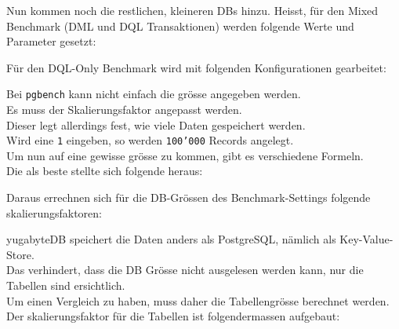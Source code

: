 \begin{flushleft}
    Nun kommen noch die restlichen, kleineren DBs hinzu.
    Heisst, für den Mixed Benchmark (DML und DQL \Gls{Transaktion}en) werden folgende Werte und Parameter gesetzt:
    
\end{flushleft}
\begin{flushleft}
    Für den DQL-Only Benchmark wird mit folgenden Konfigurationen gearbeitet:
    
\end{flushleft}
\begin{flushleft}
    Bei \texttt{pgbench} kann nicht einfach die grösse angegeben werden.\\
    Es muss der Skalierungsfaktor angepasst werden.\\
    Dieser legt allerdings fest, wie viele Daten gespeichert werden.\\
    Wird eine \texttt{1} eingeben, so werden \texttt{100'000} Records angelegt.\\

    Um nun auf eine gewisse grösse zu kommen, gibt es verschiedene Formeln.\\
    Die als beste stellte sich folgende heraus\cite{DKXU3QRC}:\\
    
\end{flushleft}
\begin{flushleft}
    Daraus errechnen sich für die DB-Grössen des Benchmark-Settings folgende skalierungsfaktoren:\\
    
\end{flushleft}
\begin{flushleft}
    yugabyteDB speichert die Daten anders als PostgreSQL, nämlich als \Gls{Key-Value-Store}.\\
    Das verhindert, dass die DB Grösse nicht ausgelesen werden kann, nur die Tabellen sind ersichtlich.\\
    Um einen Vergleich zu haben, muss daher die Tabellengrösse berechnet werden.\\
    Der skalierungsfaktor für die Tabellen ist folgendermassen aufgebaut:\\
    
\end{flushleft}
